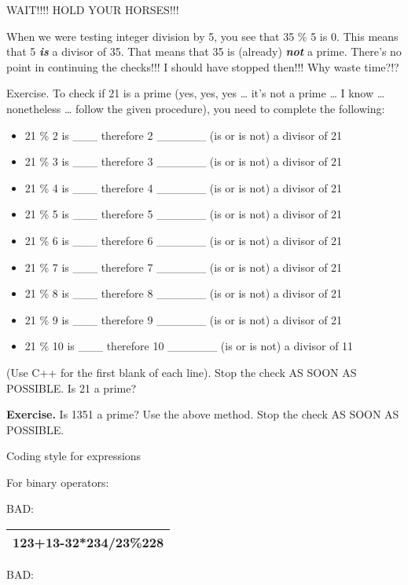 \documentclass[
]{article}
\providecommand{\tightlist}{%
  \setlength{\itemsep}{0pt}\setlength{\parskip}{0pt}}
\begin{document}
WAIT!!!! HOLD YOUR HORSES!!!

When we were testing integer division by 5, you see that 35 \% 5 is 0.
This means that 5 \emph{\textbf{is}} a divisor of 35. That means that 35
is (already) \emph{\textbf{not}} a prime. There's no point in continuing
the checks!!! I should have stopped then!!! Why waste time?!?

Exercise. To check if 21 is a prime (yes, yes, yes \ldots{} it's not a
prime \ldots{} I know \ldots{} nonetheless \ldots{} follow the given
procedure), you need to complete the following:

\begin{itemize}
\tightlist
\item
  21 \% 2 is \_\_\_ therefore 2 \_\_\_\_\_\_ (is or is not) a divisor of
  21
\item
  21 \% 3 is \_\_\_ therefore 3 \_\_\_\_\_\_ (is or is not) a divisor of
  21
\item
  21 \% 4 is \_\_\_ therefore 4 \_\_\_\_\_\_ (is or is not) a divisor of
  21
\item
  21 \% 5 is \_\_\_ therefore 5 \_\_\_\_\_\_ (is or is not) a divisor of
  21
\item
  21 \% 6 is \_\_\_ therefore 6 \_\_\_\_\_\_ (is or is not) a divisor of
  21
\item
  21 \% 7 is \_\_\_ therefore 7 \_\_\_\_\_\_ (is or is not) a divisor of
  21
\item
  21 \% 8 is \_\_\_ therefore 8 \_\_\_\_\_\_ (is or is not) a divisor of
  21
\item
  21 \% 9 is \_\_\_ therefore 9 \_\_\_\_\_\_ (is or is not) a divisor of
  21
\item
  21 \% 10 is \_\_\_ therefore 10 \_\_\_\_\_\_ (is or is not) a divisor
  of 11
\end{itemize}

(Use C++ for the first blank of each line). Stop the check AS SOON AS
POSSIBLE. Is 21 a prime?

\textbf{Exercise.} Is 1351 a prime? Use the above method. Stop the check
AS SOON AS POSSIBLE.

Coding style for expressions

For binary operators:

BAD:

\begin{longtable}[]{@{}l@{}}
\toprule
\endhead
123+13-32*234/23\%228\tabularnewline
\bottomrule
\end{longtable}

BAD:
\end{document}
